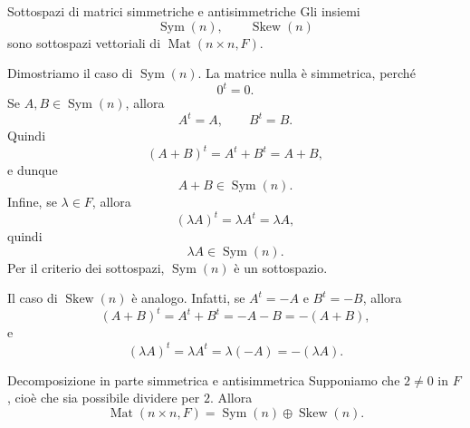 \documentclass[a4paper]{article}
\begin{document}
\begin{snippetproposition}{Sottospazi di matrici simmetriche e antisimmetriche}
    Gli insiemi
    \[
        \operatorname{Sym}(n),
        \qquad
        \operatorname{Skew}(n)
    \]
    sono sottospazi vettoriali di \(\operatorname{Mat}(n\times n,F)\).
\end{snippetproposition}

\begin{snippetproof}{}
    Dimostriamo il caso di \(\operatorname{Sym}(n)\). La matrice nulla è simmetrica, perché
    \[
        0^t=0.
    \]
    Se \(A,B\in\operatorname{Sym}(n)\), allora
    \[
        A^t=A,
        \qquad
        B^t=B.
    \]
    Quindi
    \[
        (A+B)^t=A^t+B^t=A+B,
    \]
    e dunque
    \[
        A+B\in\operatorname{Sym}(n).
    \]
    Infine, se \(\lambda\in F\), allora
    \[
        (\lambda A)^t=\lambda A^t=\lambda A,
    \]
    quindi
    \[
        \lambda A\in\operatorname{Sym}(n).
    \]
    Per il criterio dei sottospazi, \(\operatorname{Sym}(n)\) è un sottospazio.

    Il caso di \(\operatorname{Skew}(n)\) è analogo. Infatti, se \(A^t=-A\) e \(B^t=-B\), allora
    \[
        (A+B)^t=A^t+B^t=-A-B=-(A+B),
    \]
    e
    \[
        (\lambda A)^t=\lambda A^t=\lambda(-A)=-(\lambda A).
    \]
\end{snippetproof}

\begin{snippetproposition}{Decomposizione in parte simmetrica e antisimmetrica}
    Supponiamo che \(2\neq 0\) in \(F\), cioè che sia possibile dividere per \(2\). Allora
    \[
        \operatorname{Mat}(n\times n,F)
        =
        \operatorname{Sym}(n)\oplus\operatorname{Skew}(n).
    \]
\end{snippetproposition}
\end{document}
